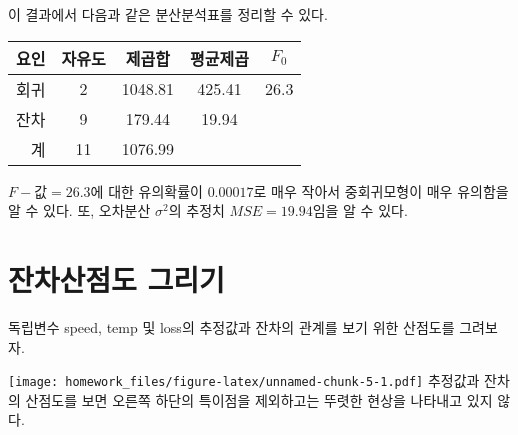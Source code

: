 \documentclass[]{article}
\newenvironment{Shaded}{\begin{snugshade}}{\end{snugshade}}
\newcommand{\KeywordTok}[1]{\textcolor[rgb]{0.13,0.29,0.53}{\textbf{#1}}}
\newcommand{\DataTypeTok}[1]{\textcolor[rgb]{0.13,0.29,0.53}{#1}}
\newcommand{\DecValTok}[1]{\textcolor[rgb]{0.00,0.00,0.81}{#1}}
\newcommand{\OperatorTok}[1]{\textcolor[rgb]{0.81,0.36,0.00}{\textbf{#1}}}
\newcommand{\NormalTok}[1]{#1}
\begin{document}
이 결과에서 다음과 같은 분산분석표를 정리할 수 있다.

\begin{longtable}[]{@{}rcccc@{}}
\toprule
요인 & 자유도 & 제곱합 & 평균제곱 & \(F_0\)\tabularnewline
\midrule
\endhead
회귀 & 2 & 1048.81 & 425.41 & 26.3\tabularnewline
잔차 & 9 & 179.44 & 19.94 &\tabularnewline
계 & 11 & 1076.99 & &\tabularnewline
\bottomrule
\end{longtable}

\(F-값 = 26.3\)에 대한 유의확률이 \(0.00017\)로 매우 작아서 중회귀모형이
매우 유의함을 알 수 있다. 또, 오차분산 \(\sigma^2\)의 추정치
\(MSE = 19.94\)임을 알 수 있다.

\section{잔차산점도
그리기}\label{uxc794uxcc28uxc0b0uxc810uxb3c4-uxadf8uxb9acuxae30}

독립변수 speed, temp 및 loss의 추정값과 잔차의 관계를 보기 위한 산점도를
그려보자.

\begin{Shaded}
\end{Shaded}

\texttt{[image: homework\_files/figure-latex/unnamed-chunk-5-1.pdf]}
추정값과 잔차의 산점도를 보면 오른쪽 하단의 특이점을 제외하고는 뚜렷한
현상을 나타내고 있지 않다.
\end{document}
